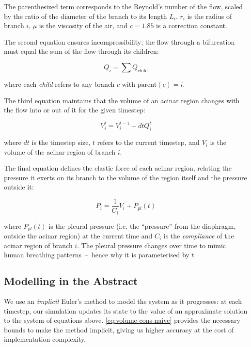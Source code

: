 The parenthesized term corresponds to the Reynold's number of the flow, scaled by the ratio of the
diameter of the branch to its length $L_i$. $r_i$ is the radius of branch $i$, $\mu$ is the
viscosity of the air, and $c = 1.85$ is a correction constant.

The second equation ensures incompressibility; the flow through a bifurcation must equal the sum of
the flow through its children:

\begin{equation}
    Q_i = \sum Q_{\text{child}}
\end{equation}

\noindent
where each \textit{child} refers to any branch $c$ with $\text{parent}(c) = i$.

The third equation maintains that the volume of an acinar region changes with the flow into or out
of it for the given timestep:

\begin{equation}
    V_i^t = V_i^{t-1} + dt Q_i^t
\end{equation}

\noindent
where $dt$ is the timestep size, $t$ refers to the current timestep, and $V_i$ is the volume of the
acinar region of branch $i$.

The final equation defines the elastic force of each acinar region, relating the pressure it exerts
on its branch to the volume of the region itself and the pressure outside it:

\begin{equation} \label{eq:volume-cons-naive}
    P_i = \frac{1}{C_i} V_i + P_{pl}(t)
\end{equation}

\noindent
where $P_{pl}(t)$ is the pleural pressure (i.e. the ``pressure'' from the diaphragm, outside the
acinar region) at the current time and $C_i$ is the \textit{compliance} of the acinar region of
branch $i$. The pleural pressure changes over time to mimic human breathing patterns~--~hence why it
is parameterised by $t$.

\subsection{Modelling in the Abstract} \label{sec:modelling-in-the-abstract}

We use an \textit{implicit} Euler's method to model the system as it progresses: at each timestep,
our simulation updates its state to the value of an approximate solution to the system of equations
above. \autoref{eq:volume-cons-naive} provides the necessary bounds to make the method implicit,
giving us higher accuracy at the cost of implementation complexity.

